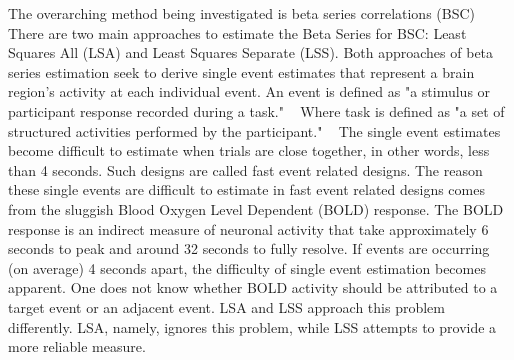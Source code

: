 \documentclass[10pt,letterpaper]{article}
\begin{document}
The overarching method being investigated is beta series correlations (BSC) ~\cite{Rissman2004,Mumford2012,Turner2012a,Abdulrahman2016}
There are two main approaches to estimate the Beta Series for BSC: Least Squares All (LSA) and Least Squares Separate (LSS).
Both approaches of beta series estimation seek to derive single event estimates that represent a brain region's activity
at each individual event.
An event is defined as "a stimulus or participant response recorded during a task." ~\cite{Gorgolewski2016}
Where task is defined as "a set of structured activities performed by the participant." ~\cite{Gorgolewski2016}
The single event estimates become difficult to estimate when trials are close together,
in other words, less than 4 seconds.
Such designs are called fast event related designs.
The reason these single events are difficult to estimate in fast event related designs comes from
the sluggish Blood Oxygen Level Dependent (BOLD) response.
The BOLD response is an indirect measure of neuronal activity that take approximately 6 seconds to
peak and around 32 seconds to fully resolve.
If events are occurring (on average) 4 seconds apart, the difficulty of single event estimation
becomes apparent.
One does not know whether BOLD activity should be attributed to a target event or an
adjacent event.
LSA and LSS approach this problem differently.
LSA, namely, ignores this problem, while LSS attempts to provide a more reliable measure.
\end{document}
